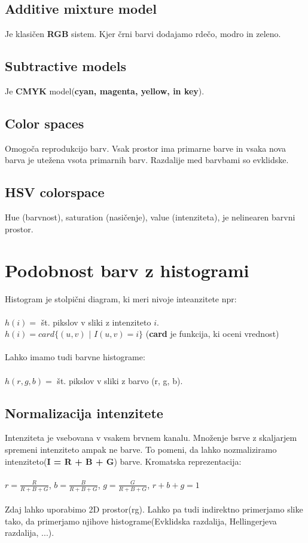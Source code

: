 \documentclass[11pt]{article}
\begin{document}
\subsection{Additive mixture model}
Je klasi\v{c}en \textbf{RGB} sistem. Kjer \v{c}rni barvi dodajamo rde\v{c}o, modro in zeleno.

\subsection{Subtractive models}
Je \textbf{CMYK} model(\textbf{cyan, magenta, yellow, in key}).

\newpage

\subsection{Color spaces}
Omogo\v{c}a reprodukcijo barv. Vsak prostor ima primarne barve in vsaka nova barva je utežena vsota primarnih barv. Razdalije med barvbami so evklidske.

\subsection{HSV colorspace}
Hue (barvnost), saturation (nasičenje), value (intenziteta), je nelinearen barvni prostor.

\section{Podobnost barv z histogrami}
Histogram je stolpi\v{c}ni diagram, ki meri nivoje inteanzitete npr: \\
\\
\indent $h(i) =$ \v{s}t. pikslov v sliki z intenziteto $i$. \\
\indent $h(i) = card\{(u,v)$ $|$ $I(u,v) = i\}$ (\textbf{card} je funkcija, ki oceni vrednost) \\
\\
Lahko imamo tudi barvne histograme: \\
\\
\indent $h(r, g, b) =$ \v{s}t. pikslov v sliki z barvo (r, g, b).

\subsection{Normalizacija intenzitete}
Intenziteta je vsebovana v vsakem brvnem kanalu. Mno\v{z}enje bsrve z skaljarjem spremeni intenziteto ampak ne barve. To pomeni, da lahko nozmaliziramo intenziteto(\textbf{I = R + B + G}) barve. Kromatska reprezentacija: \\
\\
\indent $r = \frac{R}{R+B+G}$, $b = \frac{B}{R+B+G}$, $g = \frac{G}{R+B+G}$, $r + b + g = 1$ \\
\\
Zdaj lahko uporabimo 2D prostor(rg). Lahko pa tudi indirektno primerjamo slike tako, da primerjamo njihove histograme(Evklidska razdalija, Hellingerjeva razdalija, ...).
\end{document}
